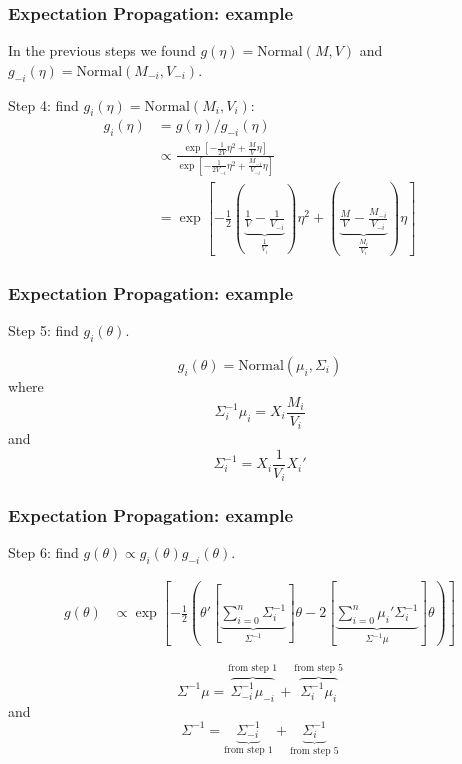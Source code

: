 \documentclass{beamer}
\begin{document}
\begin{frame}[fragile]
\frametitle{Expectation Propagation: example}

In the previous steps we found $g(\eta) = \text{Normal}(M,V)$ and $g_{-i}(\eta) = \text{Normal}(M_{-i}, V_{-i}) $.
\newline


Step 4: find $g_i(\eta) = \text{Normal}(M_i, V_i)$:
\begin{align*}
g_i(\eta) &= g(\eta)/g_{-i}(\eta)  \\
&\propto \frac{ \exp\left[-\frac{1}{2V}\eta^2 + \frac{M}{V}\eta  \right] }{\exp\left[-\frac{1}{2V_{-i} }\eta^2 + \frac{M_{-i} }{V_{-i} }\eta  \right] } \\
&= \exp\left[-\frac{1}{2} \left(\underbrace{ \frac{1}{V} - \frac{1}{V_{-i} }  }_{\frac{1}{V_i}} \right)\eta^2 + \left( \underbrace{\frac{M}{V} - \frac{M_{-i} }{V_{-i} }}_{\frac{M_i}{V_i} } \right) \eta  \right] 
\end{align*}

\end{frame}

\begin{frame}[fragile]
\frametitle{Expectation Propagation: example}


Step 5: find $g_i(\theta)$.
\newline

$$
g_i(\theta) = \text{Normal}(\mu_i, \Sigma_i)
$$
where 
$$
\Sigma_i^{-1} \mu_i = X_i \frac{M_i}{V_i} 
$$
and
$$
\Sigma_i^{-1} = X_i \frac{1}{V_i}X_i'
$$

\end{frame}

\begin{frame}[fragile]
\frametitle{Expectation Propagation: example}


Step 6: find $g(\theta) \propto g_i(\theta)g_{-i}(\theta)$.
\newline

\begin{align*}
g(\theta) 
&\propto   \exp\left[-\frac{1}{2}\left( \theta'\left[\underbrace{ \sum_{i=0}^n \Sigma^{-1}_i}_{\Sigma^{-1} }\right] \theta - 2 \left[\underbrace{\sum_{i=0}^n\mu_i' \Sigma^{-1}_i}_{ \Sigma^{-1}\mu } \right]\theta \right) \right]
\end{align*}

$$
\Sigma^{-1}\mu = \overbrace{\Sigma^{-1}_{-i}\mu_{-i}}^{\text{from step 1} } + \overbrace{\Sigma^{-1}_{i}\mu_{i}}^{\text{from step 5}}
$$
and
$$
\Sigma^{-1} = \underbrace{\Sigma^{-1}_{-i}}_{\text{from step 1} } + \underbrace{\Sigma^{-1}_i}_{\text{from step 5}}
$$

\end{frame}
\end{document}

